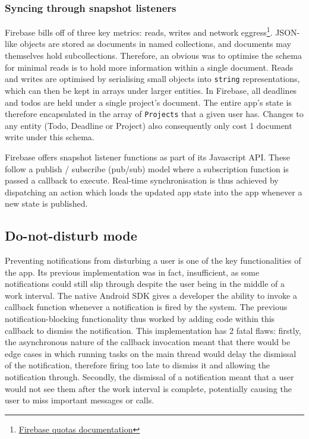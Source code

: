 \subsubsection{Syncing through snapshot listeners}
Firebase bills off of three key metrics: reads, writes and network eggress\footnote{\href{https://cloud.google.com/firestore/quotas}{Firebase quotas documentation}}. JSON-like objects are stored as documents in named collections, and documents may themselves hold subcollections. Therefore, an obvious was to optimise the schema for minimal reads is to hold more information within a single document. Reads and writes are optimised by serialising small objects into \texttt{string} representations, which can then be kept in arrays under larger entities. In Firebase, all deadlines and todos are held under a single project's document. The entire app's state is therefore encapsulated in the array of \texttt{Projects} that a given user has. Changes to any entity (Todo, Deadline or Project) also consequently only cost 1 document write under this schema.

Firebase offers snapshot listener functions as part of its Javascript API. These follow a publish / subscribe (pub/sub) model where a subscription function is passed a callback to execute. Real-time synchronisation is thus achieved by dispatching an action which loads the updated app state into the app whenever a new state is published.


\subsection{Do-not-disturb mode}
Preventing notifications from disturbing a user is one of the key functionalities of the app. Its previous implementation was in fact, insufficient, as some notifications could still slip through despite the user being in the middle of a work interval. The native Android SDK gives a developer the ability to invoke a callback function whenever a notification is fired by the system. The previous notification-blocking functionality thus worked by adding code within this callback to dismiss the notification. This implementation has 2 fatal flaws: firstly, the asynchronous nature of the callback invocation meant that there would be edge cases in which running tasks on the main thread would delay the dismissal of the notification, therefore firing too late to dismiss it and allowing the notification through. Secondly, the dismissal of a notification meant that a user would not see them after the work interval is complete, potentially causing the user to miss important messages or calls.

